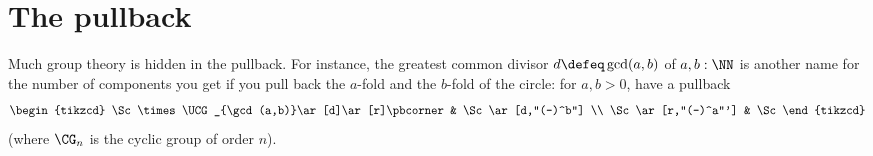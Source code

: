 \begin{example}[Sudoku]
  
\end{example}

\begin{example}
  
\end{example}

\section{The pullback}
\label{sec:pullback}

\begin{example}
  \label{ex:pullbackandgcd}
  Much group theory is hidden in the pullback.
  For instance, the greatest common divisor $d\defeq\gcd(a,b)$ of $a,b:\NN$
  is another name for the number of components you get if you pull back the
  $a$-fold and the $b$-fold \coverings of the circle: for $a,b > 0$,
  have a pullback
  \[
    \begin{tikzcd}
      \Sc\times\UCG_{\gcd(a,b)}\ar[d]\ar[r]\pbcorner & \Sc\ar[d,"(-)^b"] \\
      \Sc\ar[r,"(-)^a"'] & \Sc
    \end{tikzcd}
  \]
  (where $\CG_n$ is the cyclic group of order $n$).


\end{example}
